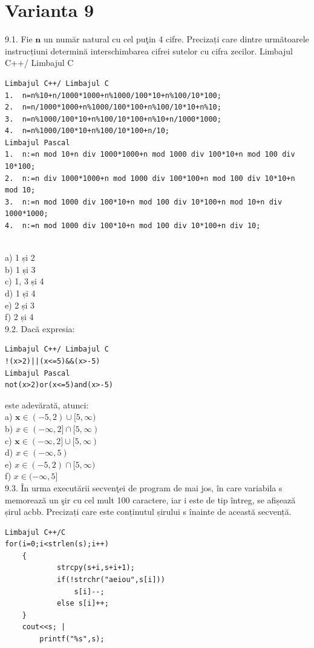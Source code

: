 \section*{Varianta 9}

9.1. Fie $\mathbf{n}$ un număr natural cu cel puţin 4 cifre. Precizați care dintre următoarele instrucțiuni determină interschimbarea cifrei sutelor cu cifra zecilor.
Limbajul C++/ Limbajul C
\begin{verbatim}
Limbajul C++/ Limbajul C 
1.  n=n%10+n/1000*1000+n%1000/100*10+n%100/10*100; 
2.  n=n/1000*1000+n%1000/100*100+n%100/10*10+n%10; 
3.  n=n%1000/100*10+n%100/10*100+n%10+n/1000*1000; 
4.  n=n%1000/100*10+n%100/10*100+n/10; 
Limbajul Pascal 
1.  n:=n mod 10+n div 1000*1000+n mod 1000 div 100*10+n mod 100 div 10*100; 
2.  n:=n div 1000*1000+n mod 1000 div 100*100+n mod 100 div 10*10+n mod 10; 
3.  n:=n mod 1000 div 100*10+n mod 100 div 10*100+n mod 10+n div 1000*1000; 
4.  n:=n mod 1000 div 100*10+n mod 100 div 10*100+n div 10;
\end{verbatim}
\\
a) 1 și 2
\\
b) 1 și 3
\\
c) 1, 3 și 4
\\
d) 1 și 4
\\
e) 2 și 3
\\
f) 2 și 4
\\ 
9.2. Dacă expresia:
\begin{verbatim}
Limbajul C++/ Limbajul C
!(x>2)||(x<=5)&&(x>-5)
Limbajul Pascal
not(x>2)or(x<=5)and(x>-5)
\end{verbatim}
este adevărată, atunci:
\\
a) $\mathbf{x} \in(-5,2) \cup[5, \infty)$
\\
b) $x \in(-\infty, 2] \cap[5, \infty)$
\\
c) $\mathbf{x} \in(-\infty, 2] \cup[5, \infty)$
\\
d) $x \in(-\infty, 5)$
\\
e) $x \in(-5,2) \cap[5, \infty)$
\\
f) $x \in(-\infty, 5]$
\\
9.3. În urma executării secvenţei de program de mai jos, în care variabila s memorează un şir cu cel mult 100 caractere, iar i este de tip întreg, se afișează șirul acbb. Precizați care este conținutul șirului s înainte de această secvență.
\begin{verbatim}
Limbajul C++/C
for(i=0;i<strlen(s);i++)
    {
            strcpy(s+i,s+i+1);
            if(!strchr("aeiou",s[i]))
                s[i]--;
            else s[i]++;
    }
    cout<<s; |
        printf("%s",s);
\end{verbatim}
